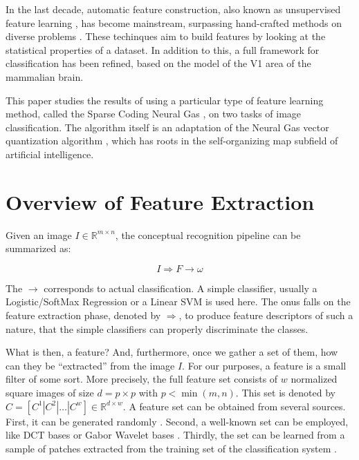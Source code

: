 \documentclass[runningheads,a4paper]{llncs}
\newcommand{\hctimes}[2]{{#1}\!\times\!{#2}}
\begin{document}
In the last decade, automatic feature construction, also known as unsupervised feature learning \cite{best-architecture-object-recognition,emergence-sparse-coding,sparse-coding-strategy-V1,tiny-images}, has become mainstream, surpassing hand-crafted methods on diverse problems \cite{best-architecture-object-recognition,learning-convolutional-feature-hierarchies,gradient-based-learning,convolutional-networks-vision,best-practices-cnn,simple-method-sparse-coding,sparse-features-audio-classification}. These techinques aim to build features by looking at the statistical properties of a dataset. In addition to this, a full framework for classification has been refined, based on the model of the V1 area of the mammalian brain.

This paper studies the results of using a particular type of feature learning method, called the Sparse Coding Neural Gas \cite{sparse-coding-neural-gas-1,sparse-coding-neural-gas-2,sparse-coding-neural-gas-3,sparse-coding-neural-gas-4}, on two tasks of image classification. The algorithm itself is an adaptation of the Neural Gas vector quantization algorithm \cite{neural-gas-1,neural-gas-2}, which has roots in the self-organizing map subfield of artificial intelligence.

\section{Overview of Feature Extraction}

Given an image $I \in \mathbb{R}^{\hctimes{m}{n}}$, the conceptual recognition pipeline can be summarized as:

\begin{equation}
I \Rightarrow F \rightarrow \omega
\end{equation}

The $\rightarrow$ corresponds to actual classification. A simple classifier, usually a Logistic/SoftMax Regression or a Linear SVM is used here. The onus falls on the feature extraction phase, denoted by $\Rightarrow$, to produce feature descriptors of such a nature, that the simple classifiers can properly discriminate the classes.

What is then, a feature? And, furthermore, once we gather a set of them, how can they be ``extracted'' from the image $I$. For our purposes, a feature is a small filter of some sort. More precisely, the full feature set consists of $w$ normalized square images of size $d = \hctimes{p}{p}$ with $p < \min(m,n)$. This set is denoted by $C = \left[ C^1 \left|\right. C^2 \left|\right. \dots \left|\right. C^w \right] \in \mathbb{R}^{\hctimes{d}{w}}$. A feature set can be obtained from several sources. First, it can be generated randomly \cite{random-weights-feature-learning}. Second, a well-known set can be employed, like DCT bases or Gabor Wavelet bases \cite{simple-method-sparse-coding}. Thirdly, the set can be learned from a sample of patches extracted from the training set of the classification system \cite{emergence-sparse-coding,sparse-coding-strategy-V1,tiny-images}.
\end{document}
